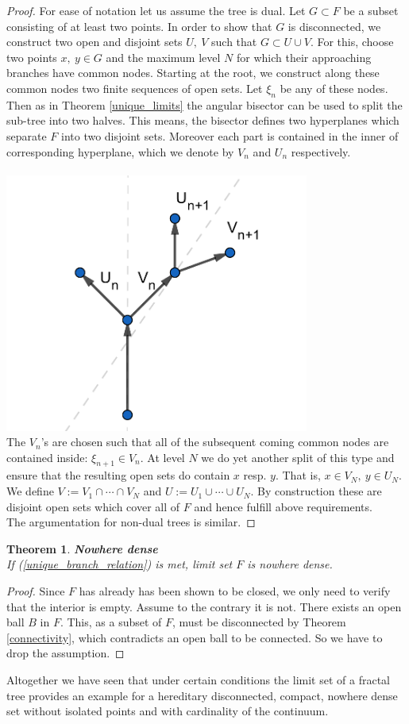\documentclass[17pt]{extarticle}
\newtheorem{theorem}{Theorem}
\begin{document}
\begin{proof}
	For ease of notation let us assume the tree is dual.
	Let $G\subset F$ be a subset consisting of at least two points. In order to show that $G$ is disconnected, we construct two open and disjoint sets $U, \ V$ such that $G\subset U\cup V$. For this, choose two points $x, \ y\in G$ and the maximum level $N$ for which their approaching branches have common nodes. Starting at the root, we construct along these common nodes two finite sequences of open sets. Let $\xi_n$ be any of these nodes. Then as in Theorem \ref{unique_limits} the angular bisector can be used to split the sub-tree into two halves. This means, the bisector defines two hyperplanes which separate $F$ into two disjoint sets. Moreover each part is contained in the inner of corresponding hyperplane, which we denote by $V_n$ and $U_n$ respectively.\\ \\
	\includegraphics[width=10cm]{heredit_discon}
	\\
	The $V_n$'s are chosen such that all of the subsequent coming common nodes are contained inside: $\xi_{n+1}\in V_n$. At level $N$ we do yet another split of this type and ensure that the resulting open sets do contain $x$ resp. $y$. That is, $x\in V_N, \ y\in U_N$.
	We define $V:=V_1\cap\cdots\cap V_N$ and $U:=U_1\cup\cdots\cup U_N$. By construction these are disjoint open sets which cover all of $F$ and hence fulfill above requirements.\\	
	The argumentation for non-dual trees is similar.
\end{proof}

\begin{theorem}
	\textbf{Nowhere dense}\\
	If (\ref{unique_branch_relation}) is met, limit set $F$ is nowhere dense.	
\end{theorem}
\begin{proof}
	Since $F$ has already has been shown to be closed, we only need to verify that the interior is empty. Assume to the contrary it is not. There exists an open ball $B$ in $F$. This, as a subset of $F$, must be disconnected by Theorem \ref{connectivity}, which contradicts an open ball to be connected. So we have to drop the assumption.
\end{proof}

Altogether we have seen that under certain conditions the limit set of a fractal tree provides an example for a hereditary disconnected, compact, nowhere dense set without isolated points and with cardinality of the continuum.
\end{document}
